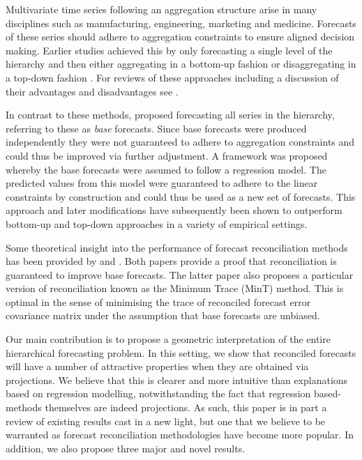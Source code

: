 \documentclass[12pt]{article}
\theoremstyle{definition}
\theoremstyle{property}
\begin{document}
	Multivariate time series following an aggregation structure arise in many disciplines such as manufacturing, engineering, marketing and medicine. Forecasts of these series should adhere to aggregation constraints to ensure aligned decision making. Earlier studies achieved this by only forecasting a single level of the hierarchy and then either aggregating in a bottom-up fashion \citep{Dunn1976} or disaggregating in a top-down fashion \citep{Gross1990, Athanasopoulos2009}.  For reviews of these approaches including a discussion of their advantages and disadvantages see \citet{Schwarzkopf1988, Kahn1998, Lapide1998, Fliedner2001}.
	
	In contrast to these methods, \cite{Hyndman2011} proposed forecasting all series in the hierarchy, referring to these as {\em base} forecasts.  Since base forecasts were produced independently they were not guaranteed to adhere to aggregation constraints and could thus be improved via further adjustment.  A framework was proposed whereby the base forecasts were assumed to follow a regression model.  The predicted values from this model were guaranteed to adhere to the linear constraints by construction and could thus be used as a new set of forecasts.  This approach and later modifications have subsequently been shown to outperform bottom-up and top-down approaches in a variety of empirical settings.
	
	Some theoretical insight into the performance of forecast reconciliation methods has been provided by \cite{VanErven2015a} and \cite{WicEtAl2019}.  Both papers provide a proof that reconciliation is guaranteed to improve base forecasts.  The latter paper also proposes a particular version of reconciliation known as the Minimum Trace (MinT) method.  This is optimal in the sense of minimising the trace of reconciled forecast error covariance matrix under the assumption that base forecasts are unbiased.
	
	Our main contribution is to propose a geometric interpretation of the entire hierarchical forecasting problem.  In this setting, we show that reconciled forecasts will have a number of attractive properties when they are obtained via projections.  We believe that this is clearer and more intuitive than explanations based on regression modelling, notwithstanding the fact that regression based-methods themselves are indeed projections.  As such, this paper is in part a review of existing results cast in a new light, but one that we believe to be warranted as forecast reconciliation methodologies have become more popular.  In addition, we also propose three major and novel results.
	
\end{document}
